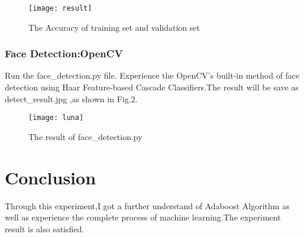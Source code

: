 \documentclass[journal, a4paper]{IEEEtran}
\begin{document}
\begin{figure}[!hbt]
		\begin{center}
		\texttt{[image: result]}
		\caption{The Accuracy of training set and validation set}
		\label{fig:tf_plot}
		\end{center}
\end{figure}

\subsubsection{Face Detection:OpenCV}
Run the face\_detection.py file. Experience the OpenCV's built-in method of face detection using Haar Feature-based Cascade Classifiers.The result will be save as detect\_result.jpg ,as shown in Fig.2.

\begin{figure}[!hbt]
		\begin{center}
		\texttt{[image: luna]}
		\caption{The result of face\_detection.py}
		\label{fig:tf_plot}
		\end{center}
	\end{figure}
\section{Conclusion}
Through this experiment,I got a further understand of Adaboost Algorithm as well as experience the complete process of machine learning.The experiment result is also satisfied.
\end{document}
